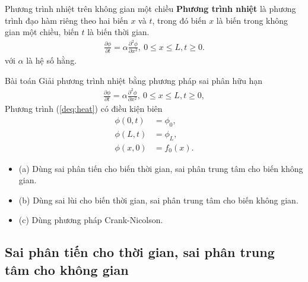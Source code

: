 \documentclass[9pt]{beamer}
\numberwithin{equation}{section}
\begin{document}
\begin{frame}
\begin{block}{Phương trình nhiệt trên không gian một chiều}
        \textbf{Phương trình nhiệt} là phương trình đạo hàm riêng theo hai biến $x$ và $t$, trong đó biến $x$ là biến trong không gian một chiều, biến $t$ là biến thời gian.
    \begin{align*}
        \frac{\partial \phi}{\partial t} = \alpha \frac{\partial^2 \phi}{\partial x^2}, \  0 \le x \le L, t \ge 0.
    \end{align*}
    với $\alpha$ là hệ số hằng.
\end{block}
\end{frame}

\begin{frame}
\begin{block}{Bài toán}
    Giải phương trình nhiệt bằng phương pháp sai phân hữu hạn
    \begin{align}
        \frac{\partial \phi}{\partial t} = \alpha \frac{\partial^2 \phi}{\partial x^2}, \  0 \le x \le L, t \ge 0, \label{deq:heat}
    \end{align}
    Phương trình (\ref{deq:heat}) có điều kiện biên
    \begin{align*}
        \phi(0,t) &= \phi_0, \\
        \phi(L,t) &= \phi_L, \\
        \phi(x,0) &= f_0(x).
    \end{align*}
    \begin{itemize}
        \item (a) Dùng sai phân tiến cho biến thời gian, sai phân trung tâm cho biến không gian.
        \item (b) Dùng sai lùi cho biến thời gian, sai phân trung tâm cho biến không gian.
        \item (c) Dùng phương pháp Crank-Nicolson.
    \end{itemize}
\end{block}
\end{frame}

\subsection{Sai phân tiến cho thời gian, sai phân trung tâm cho không gian}
\end{document}
